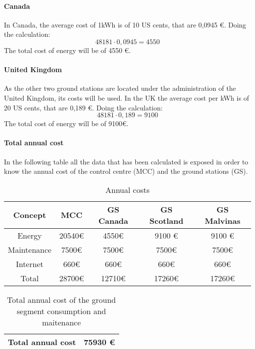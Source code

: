 \paragraph{Canada}
In Canada, the average cost of 1kWh is of 10 US cents, that are 0,0945 \euro. Doing the calculation:
\begin{equation}
48181\cdot 0,0945= 4550
\end{equation}
The total cost of energy will be of 4550 \euro.
\paragraph{United Kingdom}
As the other two ground stations are located under the administration of the United Kingdom, its costs will be used. In the UK the average cost per kWh is of 20 US cents, that are 0,189 \euro. Doing the calculation: 
  \begin{equation}
48181\cdot 0,189= 9100
\end{equation}
The total cost of energy will be of 9100\euro. 
\paragraph{Total annual cost}
In the following table all the data that has been calculated is exposed in order to know the annual cost of the control centre (MCC) and the ground stations (GS).
\begin{table}[H]
\begin{center}
\begin{tabular}{|c|c|c|c|c|}
\hline
\textbf{Concept}&\textbf{MCC}&\textbf{GS Canada}&\textbf{GS Scotland}&\textbf{GS Malvinas}\\
\hline
Energy&20540\euro &4550\euro &9100 \euro &9100 \euro\\
\hline
Maintenance&7500\euro &7500\euro &7500\euro &7500\euro \\
\hline
Internet&660\euro &660\euro &660\euro &660\euro\\
\hline
Total&28700\euro &12710\euro &17260\euro &17260\euro \\
\hline
\end{tabular}
\caption{Annual costs}
\end{center}
\end{table}
\begin{table}[H]
\begin{center}
\begin{tabular}{|c|c|}
\hline
\textbf{Total annual cost}&\textbf{75930 \euro}\\
\hline
\end{tabular}
\caption{Total annual cost of the ground segment consumption and maitenance}
\end{center}
\end{table}

